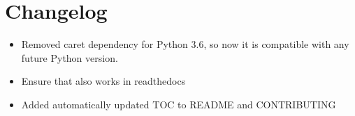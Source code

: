 \documentclass[a4paper,10pt,english]{sphinxmanual}
\begin{document}
\chapter{Changelog}
\label{\detokenize{CHANGELOG:changelog}}\label{\detokenize{CHANGELOG::doc}}
\sphinxAtStartPar
{}
\begin{itemize}
\item {}
\sphinxAtStartPar
Removed caret dependency for Python 3.6, so now it is compatible with any future Python version.

\item {}
\sphinxAtStartPar
Ensure that  also works in readthedocs

\item {}
\sphinxAtStartPar
Added automatically updated TOC to README and CONTRIBUTING

\end{itemize}
\end{document}
